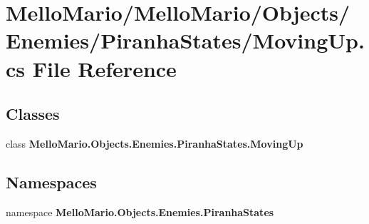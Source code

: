 \section{Mello\+Mario/\+Mello\+Mario/\+Objects/\+Enemies/\+Piranha\+States/\+Moving\+Up.cs File Reference}
\label{MovingUp_8cs}
\subsection*{Classes}
\begin{DoxyCompactItemize}
\item 
class \textbf{ Mello\+Mario.\+Objects.\+Enemies.\+Piranha\+States.\+Moving\+Up}
\end{DoxyCompactItemize}
\subsection*{Namespaces}
\begin{DoxyCompactItemize}
\item 
namespace \textbf{ Mello\+Mario.\+Objects.\+Enemies.\+Piranha\+States}
\end{DoxyCompactItemize}
